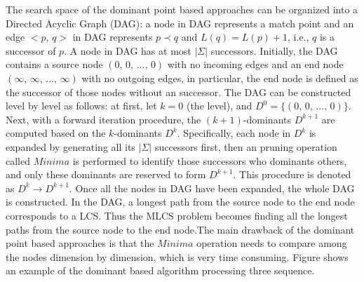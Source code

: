 \documentclass{article}
\begin{document}
The search space of the dominant point based approaches can be
organized into a Directed Acyclic Graph (DAG): a node in DAG
represents a match point and an edge $<p,\, q>$ in DAG represents
$p \prec q$ and $L(q) = L(p) + 1$, i.e., $q$ is a successor of $p$. A
node in DAG has at most $|\Sigma|$ successors. Initially, the DAG
contains a source node $(0,\, 0,\, ...,\, 0)$ with no incoming edges
and an end node $(\infty,\, \infty,\, ...,\, \infty)$ with no outgoing
edges, in particular, the end node is defined as the successor of
those nodes without an successor. The DAG can be constructed level by
level as follows: at first, let $k = 0$ (the level), and
$D^0 = \{(0,\, 0,\, ...,\, 0)\}$. Next, with a forward iteration
procedure, the $(k+1)$-dominants $D^{k+1}$ are computed based on the
$k$-dominants $D^k$. Specifically, each node in $D^k$ is expanded by
generating all its $|\Sigma|$ successors first, then an pruning
operation called $Minima$ is performed to identify those successors
who dominants others, and only these dominants are reserved to form
$D^{k+1}$. This procedure is denoted as $D^k \rightarrow D^{k+1}$.
Once all the nodes in DAG have been expanded, the whole DAG is
constructed. In the DAG, a longest path from the source node to the
end node corresponds to a LCS. Thus the MLCS problem becomes finding
all the longest paths from the source node to the end node.The main
drawback of the dominant point based approaches is that the $Minima$
operation needs to compare among the nodes dimension by dimension,
which is very time consuming. Figure shows an example of the dominant
based algorithm processing three sequence.
\end{document}
